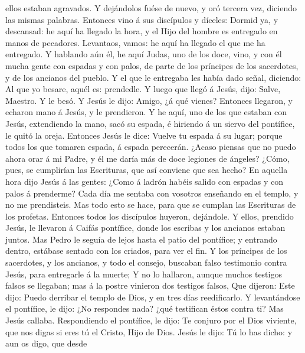 ellos estaban agravados.  Y dejándolos fuése de nuevo, y
oró tercera vez, diciendo las mismas palabras.  Entonces
vino á sus discípulos y díceles: Dormid ya, y descansad: he aquí ha
llegado la hora, y el Hijo del hombre es entregado en manos de
pecadores.  Levantaos, vamos: he aquí ha llegado el que me
ha entregado.  Y hablando aún él, he aquí Judas, uno de los
doce, vino, y con él mucha gente con espadas y con palos, de parte de
los príncipes de los sacerdotes, y de los ancianos del pueblo.
 Y el que le entregaba les había dado señal, diciendo: Al
que yo besare, aquél es: prendedle.  Y luego que llegó á
Jesús, dijo: Salve, Maestro. Y le besó.  Y Jesús le dijo:
Amigo, ¿á qué vienes? Entonces llegaron, y echaron mano á Jesús, y le
prendieron.  Y he aquí, uno de los que estaban con Jesús,
extendiendo la mano, sacó su espada, é hiriendo á un siervo del
pontífice, le quitó la oreja.  Entonces Jesús le dice:
Vuelve tu espada á su lugar; porque todos los que tomaren espada, á
espada perecerán.  ¿Acaso piensas que no puedo ahora orar á
mi Padre, y él me daría más de doce legiones de ángeles? 
¿Cómo, pues, se cumplirían las Escrituras, que así conviene que sea
hecho?  En aquella hora dijo Jesús á las gentes: ¿Como á
ladrón habéis salido con espadas y con palos á prenderme? Cada día me
sentaba con vosotros enseñando en el templo, y no me prendisteis.
 Mas todo esto se hace, para que se cumplan las Escrituras
de los profetas. Entonces todos los discípulos huyeron, dejándole.
 Y ellos, prendido Jesús, le llevaron á Caifás pontífice,
donde los escribas y los ancianos estaban juntos.  Mas
Pedro le seguía de lejos hasta el patio del pontífice; y entrando
dentro, estábase sentado con los criados, para ver el fin. 
Y los príncipes de los sacerdotes, y los ancianos, y todo el consejo,
buscaban falso testimonio contra Jesús, para entregarle á la muerte;
 Y no lo hallaron, aunque muchos testigos falsos se
llegaban; mas á la postre vinieron dos testigos falsos, 
Que dijeron: Este dijo: Puedo derribar el templo de Dios, y en tres días
reedificarlo.  Y levantándose el pontífice, le dijo: ¿No
respondes nada? ¿qué testifican éstos contra ti?  Mas Jesús
callaba. Respondiendo el pontífice, le dijo: Te conjuro por el Dios
viviente, que nos digas si eres tú el Cristo, Hijo de Dios.
 Jesús le dijo: Tú lo has dicho: y aun os digo, que desde
